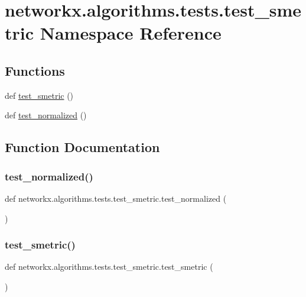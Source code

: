 \hypertarget{namespacenetworkx_1_1algorithms_1_1tests_1_1test__smetric}{}\section{networkx.\+algorithms.\+tests.\+test\+\_\+smetric Namespace Reference}
\label{namespacenetworkx_1_1algorithms_1_1tests_1_1test__smetric}
\subsection*{Functions}
\begin{DoxyCompactItemize}
\item 
def \hyperlink{namespacenetworkx_1_1algorithms_1_1tests_1_1test__smetric_a7a5fca07d171f5c33caa62391c272628}{test\+\_\+smetric} ()
\item 
def \hyperlink{namespacenetworkx_1_1algorithms_1_1tests_1_1test__smetric_a520dab322007b90f099c0e7360b53700}{test\+\_\+normalized} ()
\end{DoxyCompactItemize}


\subsection{Function Documentation}
\mbox{\label{namespacenetworkx_1_1algorithms_1_1tests_1_1test__smetric_a520dab322007b90f099c0e7360b53700}} 
\subsubsection{\texorpdfstring{test\+\_\+normalized()}{test\_normalized()}}
{\footnotesize\ttfamily def networkx.\+algorithms.\+tests.\+test\+\_\+smetric.\+test\+\_\+normalized (\begin{DoxyParamCaption}{ }\end{DoxyParamCaption})}

\mbox{\label{namespacenetworkx_1_1algorithms_1_1tests_1_1test__smetric_a7a5fca07d171f5c33caa62391c272628}} 
\subsubsection{\texorpdfstring{test\+\_\+smetric()}{test\_smetric()}}
{\footnotesize\ttfamily def networkx.\+algorithms.\+tests.\+test\+\_\+smetric.\+test\+\_\+smetric (\begin{DoxyParamCaption}{ }\end{DoxyParamCaption})}

